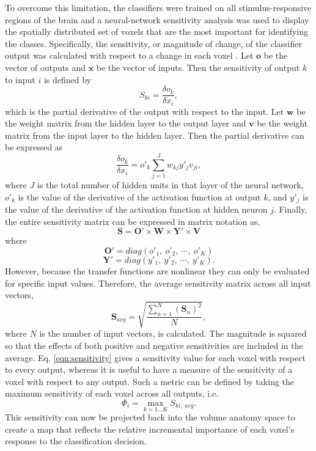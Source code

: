 \documentclass[preprint,5p,authoryear]{elsarticle}
\begin{document}
To overcome this limitation, the classifiers were trained on all stimulus-responsive regions of the brain and a neural-network sensitivity analysis was used to display the spatially distributed set of voxels that are the most important for identifying the classes.
Specifically, the sensitivity, or magnitude of change, of the classifier output was calculated with respect to a change in each voxel
 \citep{Zurada1994}.
Let $\mathbf{o}$ be the vector of outputs and $\mathbf{x}$ be the vector of inputs.
Then the sensitivity of output $k$ to input $i$ is defined by
\begin{equation}
S_{ki} = \frac{\delta o_{k}}{\delta x_{i}},
\end{equation}
which is the partial derivative of the output with respect to the input.
Let $\mathbf{w}$ be the weight matrix from the hidden layer to the output layer and $\mathbf{v}$ be the weight matrix from the input layer to the hidden layer.
Then the partial derivative can be expressed as
\begin{equation}
\frac{\delta o_{k}}{\delta x_{i}} = o'_{k} \sum^{J}_{j=1}{w_{kj}y'_{j}v_{ji}},
\end{equation}
where $J$ is the total number of hidden units in that layer of the neural network,  $o'_{k}$ is the value of the derivative of the activation function at output $k$, and $y'_{j}$ is the value of the derivative of the activation function at hidden neuron $j$.
Finally, the entire sensitivity matrix can be expressed in matrix notation as,
\begin{equation}
\mathbf{S} = \mathbf{O}' \times \mathbf{W} \times \mathbf{Y}' \times \mathbf{V}
\end{equation}
where
\begin{equation}
\mathbf{O}' = diag(o'_{1},~o'_{2},~\cdots,~o'_{K})
\end{equation}
\begin{equation}
\mathbf{Y}' = diag(y'_{1},~y'_{2},~\cdots,~y'_{K}).
\end{equation}
However, because the transfer functions are nonlinear they can only be evaluated for specific input values.
Therefore, the average sensitivity matrix across all input vectors,
\begin{equation}
\mathbf{S}_{avg} = \sqrt{ \frac{ \sum_{n = 1}^{N}{ \left( \mathbf{S}_{n}\right)^{2} } }{N} },
\label{eqn:sensitivity}
\end{equation}
where $N$ is the number of input vectors, is calculated.
The magnitude is squared so that the effects of both positive and negative sensitivities are included in the average.
Eq. \ref{eqn:sensitivity} gives a sensitivity value for each voxel with respect to every output, whereas it is useful to have a measure of the sensitivity of a voxel with respect to any output.
Such a metric can be defined by taking the maximum sensitivity of each voxel across all outputs, i.e.
\begin{equation}
\Phi_{i} = \max_{k=1 \dots K}{S_{ki,~avg}}.
\end{equation}
This sensitivity can now be projected back into the volume anatomy space to create a  map that reflects the relative incremental importance of each voxel's response to the classification decision.
\end{document}
